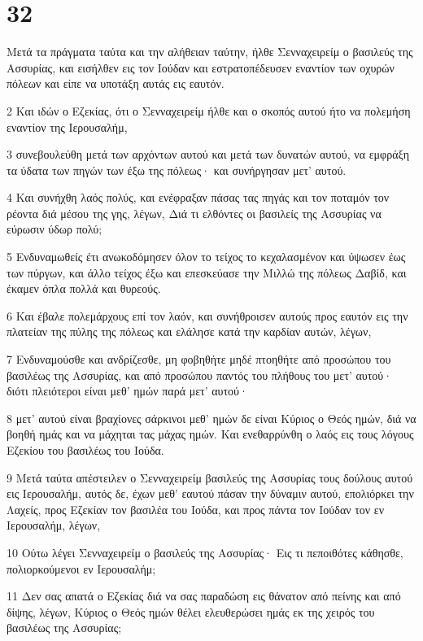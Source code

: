 \chapter{32}

\par Μετά τα πράγματα ταύτα και την αλήθειαν ταύτην, ήλθε Σενναχειρείμ ο βασιλεύς της Ασσυρίας, και εισήλθεν εις τον Ιούδαν και εστρατοπέδευσεν εναντίον των οχυρών πόλεων και είπε να υποτάξη αυτάς εις εαυτόν.
\par 2 Και ιδών ο Εζεκίας, ότι ο Σενναχειρείμ ήλθε και ο σκοπός αυτού ήτο να πολεμήση εναντίον της Ιερουσαλήμ,
\par 3 συνεβουλεύθη μετά των αρχόντων αυτού και μετά των δυνατών αυτού, να εμφράξη τα ύδατα των πηγών των έξω της πόλεως· και συνήργησαν μετ' αυτού.
\par 4 Και συνήχθη λαός πολύς, και ενέφραξαν πάσας τας πηγάς και τον ποταμόν τον ρέοντα διά μέσου της γης, λέγων, Διά τι ελθόντες οι βασιλείς της Ασσυρίας να εύρωσιν ύδωρ πολύ;
\par 5 Ενδυναμωθείς έτι ανωκοδόμησεν όλον το τείχος το κεχαλασμένον και ύψωσεν έως των πύργων, και άλλο τείχος έξω και επεσκεύασε την Μιλλώ της πόλεως Δαβίδ, και έκαμεν όπλα πολλά και θυρεούς.
\par 6 Και έβαλε πολεμάρχους επί τον λαόν, και συνήθροισεν αυτούς προς εαυτόν εις την πλατείαν της πύλης της πόλεως και ελάλησε κατά την καρδίαν αυτών, λέγων,
\par 7 Ενδυναμούσθε και ανδρίζεσθε, μη φοβηθήτε μηδέ πτοηθήτε από προσώπου του βασιλέως της Ασσυρίας, και από προσώπου παντός του πλήθους του μετ' αυτού· διότι πλειότεροι είναι μεθ' ημών παρά μετ' αυτού·
\par 8 μετ' αυτού είναι βραχίονες σάρκινοι μεθ' ημών δε είναι Κύριος ο Θεός ημών, διά να βοηθή ημάς και να μάχηται τας μάχας ημών. Και ενεθαρρύνθη ο λαός εις τους λόγους Εζεκίου του βασιλέως του Ιούδα.
\par 9 Μετά ταύτα απέστειλεν ο Σενναχειρείμ βασιλεύς της Ασσυρίας τους δούλους αυτού εις Ιερουσαλήμ, αυτός δε, έχων μεθ' εαυτού πάσαν την δύναμιν αυτού, επολιόρκει την Λαχείς, προς Εζεκίαν τον βασιλέα του Ιούδα, και προς πάντα τον Ιούδαν τον εν Ιερουσαλήμ, λέγων,
\par 10 Ούτω λέγει Σενναχειρείμ ο βασιλεύς της Ασσυρίας· Εις τι πεποιθότες κάθησθε, πολιορκούμενοι εν Ιερουσαλήμ;
\par 11 Δεν σας απατά ο Εζεκίας διά να σας παραδώση εις θάνατον από πείνης και από δίψης, λέγων, Κύριος ο Θεός ημών θέλει ελευθερώσει ημάς εκ της χειρός του βασιλέως της Ασσυρίας;
